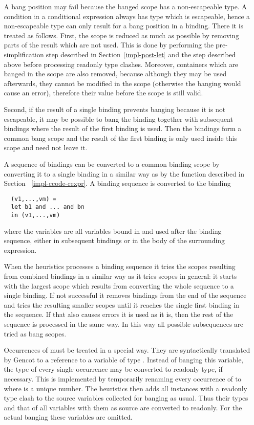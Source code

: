 A bang position may fail because the banged scope has a non-escapeable type. A condition in a conditional expression always
has type  which is escapeable, hence a non-escapeable type can only result for a bang position in a binding. There
it is treated as follows. First, the scope is reduced as much as possible by removing parts of the result which are not used.
This is done by performing the pre-simplification step  described in Section~\ref{impl-post-let} and the step
 described above before processing readonly type clashes. Moreover, containers which are banged in the scope
are also removed, because although they may be used afterwards, they cannot be modified in the scope (otherwise the banging
would cause an error), therefore their value before the scope is still valid.

Second, if the result of a single binding prevents banging because it is not escapeable, it may be possible to bang the binding
together with subsequent bindings where the result of the first binding is used. Then the bindings form a common bang scope
and the result of the first binding is only used inside this scope and need not leave it.

A sequence of bindings can be converted to a common binding scope by converting it to a single binding in a similar way as by
the function  described in Section ~\ref{impl-ccode-cexpr}. A binding sequence  is converted
to the binding
\begin{verbatim}
  (v1,...,vm) =
  let b1 and ... and bn
  in (v1,...,vm)
\end{verbatim}
where the variables  are all variables bound in  and used after the binding sequence, either
in subsequent bindings or in the body of the surrounding  expression.

When the heuristics processes a binding sequence it tries the scopes resulting from combined bindings in a similar way as it
tries scopes in general: it starts with the largest scope which results from converting the whole sequence to a single binding.
If not successful it removes bindings from the end of the sequence and tries the resulting smaller scopes until it reaches the
single first binding in the sequence. If that also causes errors it is used as it is, then the rest of the sequence is processed
in the same way. In this way all possible subsequences are tried as bang scopes.

Occurrences of  must be treated in a special way. They are syntactically translated by Gencot to a reference to a
variable  of type . Instead of banging this variable, the type of every single
occurrence may be converted to readonly type, if necessary. This is implemented by temporarily renaming every occurrence of
 to  where  is a unique number. The heuristics then adds all instances
with a readonly type clash to the source variables collected for banging as usual. Thus their types and that of all variables
with them as source are converted to readonly. For the actual banging these variables are omitted.

